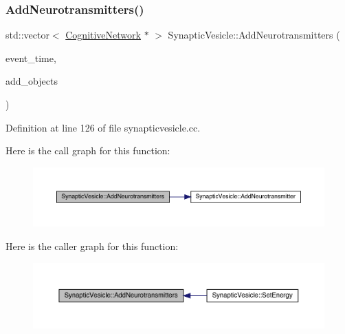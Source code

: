 \subsubsection{\texorpdfstring{Add\+Neurotransmitters()}{AddNeurotransmitters()}}
{\footnotesize\ttfamily std\+::vector$<$ \hyperlink{class_cognitive_network}{Cognitive\+Network} $\ast$ $>$ Synaptic\+Vesicle\+::\+Add\+Neurotransmitters (\begin{DoxyParamCaption}\item[{std\+::chrono\+::time\+\_\+point$<$ \hyperlink{universe_8h_a0ef8d951d1ca5ab3cfaf7ab4c7a6fd80}{Clock} $>$}]{event\+\_\+time,  }\item[{std\+::vector$<$ \hyperlink{class_cognitive_network}{Cognitive\+Network} $\ast$$>$}]{add\+\_\+objects }\end{DoxyParamCaption})}



Definition at line 126 of file synapticvesicle.\+cc.

Here is the call graph for this function\+:\nopagebreak
\begin{figure}[H]
\begin{center}
\leavevmode
\includegraphics[width=350pt]{class_synaptic_vesicle_ac924e6b7b824066a89136e52f2d5ce80_cgraph}
\end{center}
\end{figure}
Here is the caller graph for this function\+:\nopagebreak
\begin{figure}[H]
\begin{center}
\leavevmode
\includegraphics[width=350pt]{class_synaptic_vesicle_ac924e6b7b824066a89136e52f2d5ce80_icgraph}
\end{center}
\end{figure}
\mbox{\label{class_synaptic_vesicle_aa811e68d1a3220c07140847eb3ebc8b3}} 
